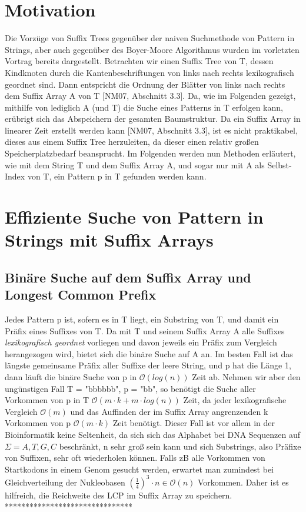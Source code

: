 \documentclass[12pt,twoside]{article}
\begin{document}
\section{Motivation}
Die Vorzüge von Suffix Trees gegenüber der naiven Suchmethode von Pattern in Strings, aber auch gegenüber des Boyer-Moore Algorithmus wurden im vorletzten Vortrag bereits dargestellt.
Betrachten wir einen Suffix Tree von T, dessen Kindknoten durch die Kantenbeschriftungen von links nach rechts lexikografisch geordnet sind. Dann entspricht die Ordnung der Blätter von links nach rechts dem Suffix Array A von T [NM07, Abschnitt 3.3]. Da, wie im Folgenden gezeigt, mithilfe von lediglich A (und T) die Suche eines Patterns in T erfolgen kann, erübrigt sich das Abspeichern der gesamten Baumstruktur. Da ein Suffix Array in linearer Zeit erstellt werden kann [NM07, Abschnitt 3.3], ist es nicht praktikabel, dieses aus einem Suffix Tree herzuleiten, da dieser einen relativ großen Speicherplatzbedarf beansprucht. Im Folgenden werden nun Methoden erläutert, wie mit dem String T und dem Suffix Array A, und sogar nur mit A als Selbst-Index von T, ein Pattern p in T gefunden werden kann.

\section{Effiziente Suche von Pattern in Strings mit Suffix Arrays}
\subsection{Binäre Suche auf dem Suffix Array und Longest Common Prefix}
Jedes Pattern p ist, sofern es in T liegt, ein Substring von T, und damit ein Präfix eines Suffixes von T. Da mit T und seinem Suffix Array A alle Suffixes \textit{lexikografisch geordnet} vorliegen und davon jeweils ein Präfix zum Vergleich herangezogen wird, bietet sich die binäre Suche auf A an. Im besten Fall ist das längste gemeinsame Präfix aller Suffixe der leere String, und p hat die Länge 1, dann läuft die binäre Suche von p in $\mathcal{O}(log (n))$ Zeit ab. Nehmen wir aber den ungünstigen Fall T =  "bbbbbb", p = "bb", so benötigt die Suche aller Vorkommen von p in T $\mathcal{O}(m\cdot k + m\cdot log(n))$ Zeit, da jeder lexikografische Vergleich $\mathcal{O}(m)$ und das Auffinden der im Suffix Array angrenzenden k Vorkommen von p $\mathcal{O}(m\cdot k)$ Zeit benötigt. Dieser Fall ist vor allem in der Bioinformatik keine Seltenheit, da sich sich das Alphabet bei DNA Sequenzen auf $\Sigma = {A,T,G,C}$ beschränkt, n sehr groß sein kann und sich Substrings, also Präfixe von Suffixen, sehr oft wiederholen können. Falls zB alle Vorkommen von Startkodons in einem Genom gesucht werden, erwartet man zumindest bei Gleichverteilung der Nukleobasen $(\frac{1}{4})^{3}\cdot n \in \mathcal{O}(n)$ Vorkommen. Daher ist es hilfreich, die Reichweite des LCP im Suffix Array zu speichern. *******************************
\end{document}
